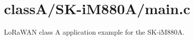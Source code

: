 \hypertarget{class_a_2_s_k-i_m880_a_2main_8c-example}{}\section{class\+A/\+S\+K-\/i\+M880\+A/main.\+c}
Lo\+Ra\+W\+AN class A application example for the S\+K-\/i\+M880A.


\begin{DoxyCodeInclude}
\end{DoxyCodeInclude}
 